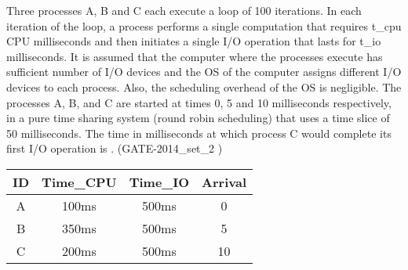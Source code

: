\begin{questyle}

  \question Three processes A, B and C each execute a loop of 100 iterations. In each iteration of the
            loop, a process performs a single computation that requires t\_cpu CPU milliseconds and then initiates
            a single I/O operation that lasts for t\_io milliseconds. It is assumed that the computer where the
            processes execute has sufficient number of I/O devices and the OS of the computer assigns
            different I/O devices to each process. Also, the scheduling overhead of the OS is negligible.
            The processes A, B, and C are started at times 0, 5 and 10 milliseconds respectively, in a pure
            time sharing system (round robin scheduling) that uses a time slice of 50 milliseconds. The time
            in milliseconds at which process C would complete its first I/O operation is \fillin[1000]. (GATE-2014\_set\_2 )

  \begin{myTableStyle}
    \begin{center}
    \begin{tabular}{ |c|c|c|c| } \hline
          ID & Time\_CPU & Time\_IO  & Arrival \\ \hline
          A & 100ms & 500ms & 0 \\ \hline
          B & 350ms & 500ms & 5 \\ \hline
          C & 200ms & 500ms & 10 \\ \hline
    \end{tabular}
    \end{center}
  \end{myTableStyle}
  \vspace{0.08in}

  \end{questyle}


